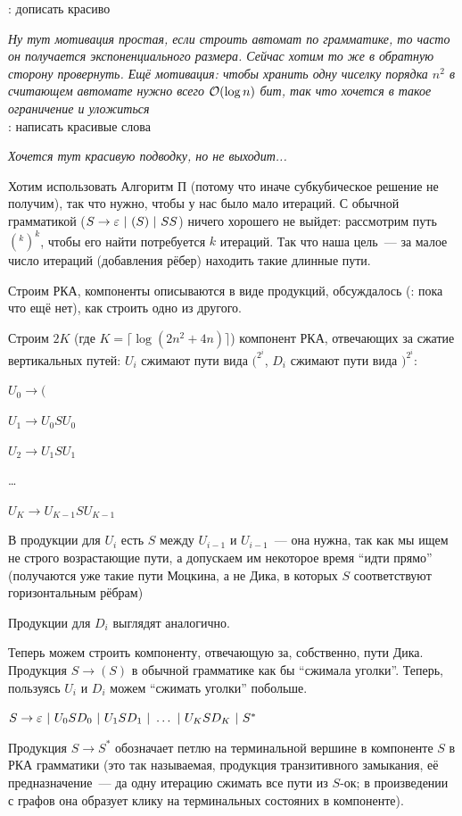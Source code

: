 \TODO: дописать красиво

\textit{Ну тут мотивация простая, если строить автомат по грамматике, то часто он получается экспоненциального размера. Сейчас хотим то же в обратную сторону провернуть. Ещё мотивация: чтобы хранить одну чиселку порядка $n^2$ в считающем автомате нужно всего $\mathcal{O}(\log n)$ бит, так что хочется в такое ограничение и уложиться}\\
\TODO: написать красивые слова

\textit{Хочется тут красивую подводку, но не выходит...}

Хотим использовать Алгоритм П (потому что иначе субкубическое решение не получим), так что нужно, чтобы у нас было мало итераций. С обычной грамматикой ($S \rightarrow \varepsilon~|~(S)~|~SS$) ничего хорошего не выйдет: рассмотрим путь $(^k )^k$, чтобы его найти потребуется $k$ итераций. Так что наша цель~--- за малое число итераций (добавления рёбер) находить такие длинные пути.

Строим РКА, компоненты описываются в виде продукций, обсуждалось (\TODO: пока что ещё нет), как строить одно из другого.

Строим $2K$ (где $K = \lceil \log (2 n^2 + 4n) \rceil$) компонент РКА, отвечающих за сжатие вертикальных путей: $U_i$ сжимают пути вида $(^{2^i}$, $D_i$ сжимают пути вида $)^{2^i}$:

$U_0 \to ($

$U_1 \to U_0 S U_0$

$U_2 \to U_1 S U_1$

\dots

$U_K \to U_{K-1} S U_{K-1}$ 

В продукции для $U_i$ есть $S$ между $U_{i-1}$ и $U_{i-1}$~--- она нужна, так как мы ищем не строго возрастающие пути, а допускаем им некоторое время ``идти прямо'' (получаются уже такие пути Моцкина, а не Дика, в которых $S$ соответствуют горизонтальным рёбрам)

Продукции для $D_i$ выглядят аналогично.

Теперь можем строить компоненту, отвечающую за, собственно, пути Дика. Продукция $S \to ( S )$ в обычной грамматике как бы ``сжимала уголки''. Теперь, пользуясь $U_i$ и $D_i$ можем ``сжимать уголки'' побольше.

$S \rightarrow \varepsilon~|~U_0 S D_0~|~U_1 S D_1~|~ \dots ~|~U_K S D_K~|~S^*$

Продукция $S \to S^*$ обозначает петлю на терминальной вершине в компоненте $S$ в РКА грамматики (это так называемая, продукция транзитивного замыкания, её предназначение~--- да одну итерацию сжимать все пути из $S$-ок; в произведении с графов она образует клику на терминальных состояних в компоненте).


